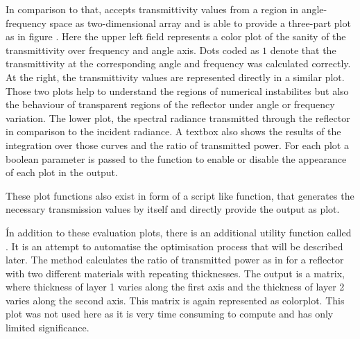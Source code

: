 In comparison to that,  accepts transmittivity values from
a region in angle-frequency space as two-dimensional array and is able to
provide a three-part plot as in figure . Here the
upper left field represents a color plot of the sanity of the transmittivity
over frequency and angle axis. Dots coded as $1$ denote that the transmittivity
at the corresponding angle and frequency was calculated correctly. At the
right, the transmittivity values are represented directly in a similar plot.
Those two plots help to understand the regions of numerical instabilites but
also the behaviour of transparent regions of the reflector under angle or
frequency variation. The lower plot, the spectral radiance transmitted through
the reflector in comparison to the incident radiance. A textbox also shows the
results of the integration over those curves and the ratio of transmitted
power.
For each plot a boolean parameter is passed to the function to enable or
disable the appearance of each plot in the output.

These plot functions also exist in form of a script like function, that
generates the necessary transmission values by itself and directly provide the
output as plot.

Ín addition to these evaluation plots, there is an additional utility function
called
. It is an attempt to automatise the
optimisation process that will be described later. The method calculates the
ratio of transmitted power as in  for a reflector with
two different materials with repeating thicknesses. The output is a matrix,
where thickness of layer 1 varies along the first axis and the thickness of
layer 2 varies along the second axis. This matrix is again represented as
colorplot. This plot was not used here as it is very time consuming to compute
and has only limited significance.


